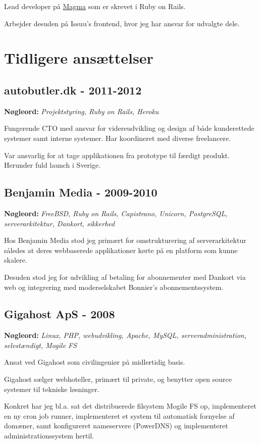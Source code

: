 \documentclass[a4paper]{article}
\newcommand{\keywords}[1]{\small\textbf{Nøgleord:} \emph{#1}\normalsize}
\begin{document}
Lead developer på \href{http://www.magmahq.com}{Magma} som er skrevet i Ruby on Rails.

Arbejder desuden på Issuu's frontend, hvor jeg har ansvar for udvalgte dele.

\section*{Tidligere ansættelser}

\subsection*{autobutler.dk - 2011-2012}
\keywords{Projektstyring, Ruby on Rails, Heroku}

Fungerende CTO med ansvar for videreudvikling og design af både kunderettede systemer samt interne systemer. Har koordineret med diverse freelancere.

Var ansvarlig for at tage applikationen fra prototype til færdigt produkt. Herunder fuld launch i Sverige. 

\subsection*{Benjamin Media - 2009-2010}

\keywords{FreeBSD, Ruby on Rails, Capistrano, Unicorn, PostgreSQL, serverarkitektur, Dankort, sikkerhed}

Hos Benjamin Media stod jeg primært for omstrukturering af serverarkitektur således at deres webbaserede applikationer kørte på en platform som kunne skalere.

Desuden stod jeg for udvikling af betaling for abonnementer med Dankort via web og integrering med moderselskabet Bonnier's abonnementssystem.

\subsection*{Gigahost ApS - 2008}

\keywords{Linux, PHP, webudvikling, Apache, MySQL, serveradministration, selvstændigt, Mogile FS}

Ansat ved Gigahost som civilingeniør på midlertidig basis.

Gigahost sælger webhoteller, primært til private, og benytter open source systemer til tekniske løsninger.

Konkret har jeg bl.a. sat det distribuerede filsystem Mogile FS op, implementeret en ny cron job runner, implementeret et system til automatisk fornyelse af domæner, samt konfigureret nameservere (PowerDNS) og implementeret administrationssystem hertil.
\end{document}
